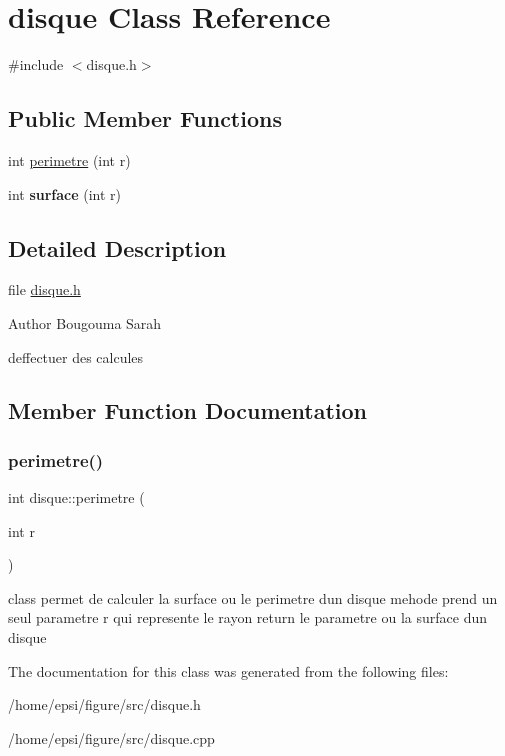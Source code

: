 \hypertarget{classdisque}{}\section{disque Class Reference}
\label{classdisque}


{\ttfamily \#include $<$disque.\+h$>$}

\subsection*{Public Member Functions}
\begin{DoxyCompactItemize}
\item 
int \hyperlink{classdisque_a8b6709ddb3499698a1839eb5c4991e8c}{perimetre} (int r)
\item 
\mbox{\label{classdisque_abb57b68d98937e82cdd17fd3549e17fe}} 
int {\bfseries surface} (int r)
\end{DoxyCompactItemize}


\subsection{Detailed Description}
file \hyperlink{disque_8h_source}{disque.\+h} \begin{DoxyAuthor}{Author}
Bougouma Sarah
\end{DoxyAuthor}
d\textquotesingle{}effectuer des calcules 

\subsection{Member Function Documentation}
\mbox{\label{classdisque_a8b6709ddb3499698a1839eb5c4991e8c}} 
\subsubsection{\texorpdfstring{perimetre()}{perimetre()}}
{\footnotesize\ttfamily int disque\+::perimetre (\begin{DoxyParamCaption}\item[{int}]{r }\end{DoxyParamCaption})}

class permet de calculer la surface ou le perimetre d\textquotesingle{}un disque  mehode prend un seul parametre r qui represente le rayon  return le parametre ou la surface d\textquotesingle{}un disque 

The documentation for this class was generated from the following files\+:\begin{DoxyCompactItemize}
\item 
/home/epsi/figure/src/disque.\+h\item 
/home/epsi/figure/src/disque.\+cpp\end{DoxyCompactItemize}
